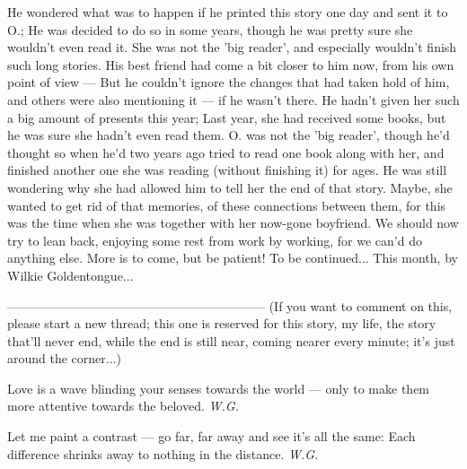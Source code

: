 He wondered what was to happen if he printed this story one day and sent it to O.; He was decided to do so in some years, though he was pretty sure she wouldn't even read it. She was not the 'big reader', and especially wouldn't finish such long stories. 
His best friend had come a bit closer to him now, from his own point of view --- But he couldn't ignore the changes that had taken hold of him, and others were also mentioning it --- if he wasn't there. 
He hadn't given her such a big amount of presents this year; Last year, she had received some books, but he was sure she hadn't even read them. O. was not the 'big reader', though he'd thought so when he'd two years ago tried to read one book along with her, and finished another one she was reading (without finishing it) for ages. He was still wondering why she had allowed him to tell her the end of that story. 
Maybe, she wanted to get rid of that memories, of these connections between them, for this was the time when she was together with her now-gone boyfriend. 
We should now try to lean back, enjoying some rest from work by working, for we can'd do anything else. More is to come, but be patient! 
To be continued...
This month, by Wilkie Goldentongue...

--------------------------------------------------------------
(If you want to comment on this, please start a new thread; this one is reserved for this story, my life, the story that'll never end, while the end is still near, coming nearer every minute; it's just around the corner...)

Love is a wave 
blinding your senses 
towards the world --- 
only to make them more attentive 
towards the beloved. 
\emph{W.G.}

Let me paint a contrast --- 
go far, far away 
and see it's all the same: 
Each difference shrinks away 
to nothing 
in the distance. 
\emph{W.G.}

